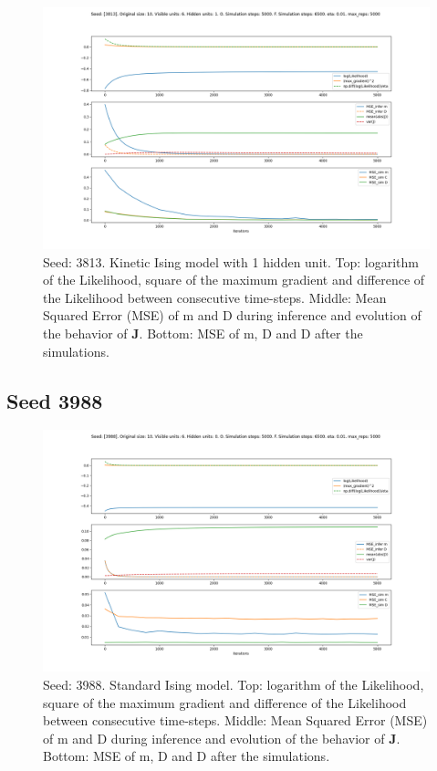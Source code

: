 \documentclass{article}
\def\*#1{\mathbf{#1}}
\begin{document}
\begin{figure}[!htb]
    \centering
    \includegraphics[width=0.8\linewidth]{images/sqrt_size/[3813]_10_6_1_5000_6500_eta001_5000_100.png}
\caption{Seed: 3813. Kinetic Ising model with 1 hidden unit. Top: logarithm of the Likelihood, square of the maximum gradient and difference of the Likelihood between consecutive time-steps. Middle: Mean Squared Error (MSE) of m and D during inference and evolution of the behavior of $\*J$. Bottom: MSE of m, D and D after the simulations.}
\end{figure}



\newpage
\subsection{Seed 3988}

\begin{figure}[!htb]
    \centering
    \includegraphics[width=0.8\linewidth]{images/sqrt_size/[3988]_10_6_0_5000_6500_eta001_5000_100.png}
\caption{Seed: 3988. Standard Ising model. Top: logarithm of the Likelihood, square of the maximum gradient and difference of the Likelihood between consecutive time-steps. Middle: Mean Squared Error (MSE) of m and D during inference and evolution of the behavior of $\*J$. Bottom: MSE of m, D and D after the simulations.}
\end{figure}
\end{document}
